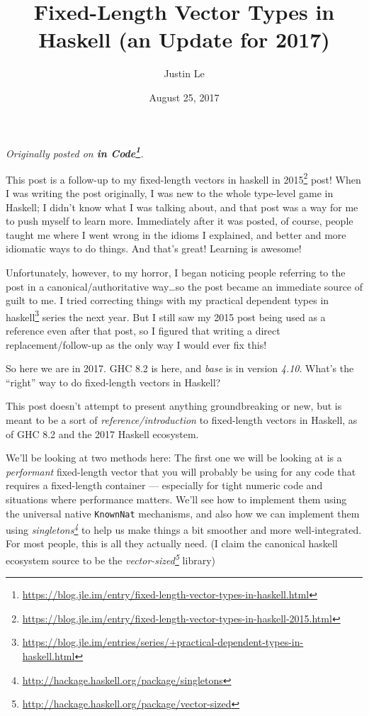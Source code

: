 \documentclass[]{article}
\title{Fixed-Length Vector Types in Haskell (an Update for 2017)}
\author{Justin Le}
\date{August 25, 2017}
\renewcommand{\href}[2]{#2\footnote{\url{#1}}}
\begin{document}
\maketitle

\emph{Originally posted on
\textbf{\href{https://blog.jle.im/entry/fixed-length-vector-types-in-haskell.html}{in
Code}}.}

This post is a follow-up to my
\href{https://blog.jle.im/entry/fixed-length-vector-types-in-haskell-2015.html}{fixed-length
vectors in haskell in 2015} post! When I was writing the post originally, I was
new to the whole type-level game in Haskell; I didn't know what I was talking
about, and that post was a way for me to push myself to learn more. Immediately
after it was posted, of course, people taught me where I went wrong in the
idioms I explained, and better and more idiomatic ways to do things. And that's
great! Learning is awesome!

Unfortunately, however, to my horror, I began noticing people referring to the
post in a canonical/authoritative way\ldots so the post became an immediate
source of guilt to me. I tried correcting things with my
\href{https://blog.jle.im/entries/series/+practical-dependent-types-in-haskell.html}{practical
dependent types in haskell} series the next year. But I still saw my 2015 post
being used as a reference even after that post, so I figured that writing a
direct replacement/follow-up as the only way I would ever fix this!

So here we are in 2017. GHC 8.2 is here, and \emph{base} is in version
\emph{4.10}. What's the ``right'' way to do fixed-length vectors in Haskell?

This post doesn't attempt to present anything groundbreaking or new, but is
meant to be a sort of \emph{reference/introduction} to fixed-length vectors in
Haskell, as of GHC 8.2 and the 2017 Haskell ecosystem.

We'll be looking at two methods here: The first one we will be looking at is a
\emph{performant} fixed-length vector that you will probably be using for any
code that requires a fixed-length container --- especially for tight numeric
code and situations where performance matters. We'll see how to implement them
using the universal native \texttt{KnownNat} mechanisms, and also how we can
implement them using
\emph{\href{http://hackage.haskell.org/package/singletons}{singletons}} to help
us make things a bit smoother and more well-integrated. For most people, this is
all they actually need. (I claim the canonical haskell ecosystem source to be
the \emph{\href{http://hackage.haskell.org/package/vector-sized}{vector-sized}}
library)
\end{document}
